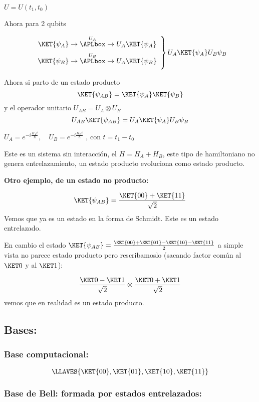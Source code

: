$U=U(t_{1},t_{0})$

Ahora para 2 qubits

\[
\left.\begin{array}{c}
\underset{}{\KET{\psi_{A}}}\rightarrow\overset{U_{A}}{\APLbox}\rightarrow U_{A}\underset{}{\KET{\psi_{A}}}\\
\underset{}{\KET{\psi_{B}}}\rightarrow\overset{U_{B}}{\APLbox}\rightarrow U_{A}\underset{}{\KET{\psi_{B}}}
\end{array}\right\} U_{A}\KET{\psi_{A}}U_{B}\psi_{B}
\]

Ahora si parto de un estado producto 
\[
\KET{\psi_{AB}}=\KET{\psi_{A}}\KET{\psi_{B}}
\]
y el operador unitario $U_{AB}=U_{A}\otimes U_{B}$
\[
U_{AB}\KET{\psi_{AB}}=U_{A}\KET{\psi_{A}}U_{B}\psi_{B}
\]

$U_{A}=e^{-i\frac{H_{A}t}{\hbar}},\quad U_{B}=e^{-i\frac{H_{B}t}{\hbar}}$
, con $t=t_{1}-t_{0}$

Este es un sistema sin interacción, el $H=H_{A}+H_{B}$, este tipo
de hamiltoniano no genera entrelazamiento, un estado producto evoluciona
como estado producto.

\textbf{Otro ejemplo, de un estado no producto:}

\[
\KET{\psi_{AB}}=\frac{\KET{00}+\KET{11}}{\sqrt{2}}
\]
Vemos que ya es un estado en la forma de Schmidt. Este es un estado
entrelazado. 

En cambio el estado $\KET{\psi_{AB}}=\frac{\KET{00}+\KET{01}-\KET{10}-\KET{11}}{2}$
a simple vista no parece estado producto pero rescribamoslo (sacando
factor común al $\KET 0$ y al $\KET 1$):

\[
\frac{\KET 0-\KET 1}{\sqrt{2}}\otimes\frac{\KET 0+\KET 1}{\sqrt{2}}
\]
 vemos que en realidad es un estado producto.

\subsection{Bases:}

\subsubsection{Base computacional:}

\[
\LLAVES{\KET{00},\KET{01},\KET{10},\KET{11}}
\]


\subsubsection{Base de Bell: formada por estados entrelazados:}

